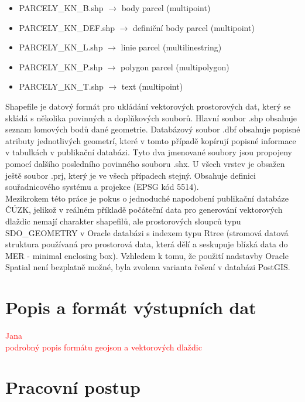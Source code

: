 \documentclass[12pt]{article}
\begin{document}
\begin{itemize}
\item PARCELY\_KN\_B.shp $\rightarrow$ body parcel (multipoint)
\item PARCELY\_KN\_DEF.shp $\rightarrow$ definiční body parcel (multipoint)
\item PARCELY\_KN\_L.shp $\rightarrow$ linie parcel (multilinestring)
\item PARCELY\_KN\_P.shp $\rightarrow$ polygon parcel (multipolygon)
\item PARCELY\_KN\_T.shp $\rightarrow$ text (multipoint)
\end{itemize}

Shapefile je datový formát pro ukládání vektorových prostorových dat, který se skládá s několika povinných a doplňkových souborů. Hlavní soubor .shp obsahuje seznam lomových bodů dané geometrie. Databázový soubor .dbf obsahuje popisné atributy jednotlivých geometrí, které v tomto případě kopírují popisné informace v tabulkách v publikační databázi. Tyto dva jmenované soubory jsou propojeny pomocí dalšího posledního povinného souboru .shx. U všech vrstev je obsažen ještě soubor .prj, který je ve všech případech stejný. Obsahuje definici souřadnicového systému a projekce (EPSG kód 5514). \\
\indent Mezikrokem této práce je pokus o jednoduché napodobení publikační databáze ČÚZK, jelikož v reálném příkladě počáteční data pro generování vektorových dlaždic nemají charakter shapefilů, ale prostorových sloupců typu SDO\_GEOMETRY v Oracle databázi s indexem typu Rtree  (stromová datová struktura používaná pro prostorová data, která dělí a seskupuje blízká data do MER - minimal enclosing box). Vzhledem k tomu, že použití nadstavby Oracle Spatial není bezplatně možné, byla zvolena varianta řešení v databázi PostGIS.



\clearpage 
\section{Popis a formát výstupních dat}

\textcolor{red}{
Jana\\
podrobný popis formátu geojson a vektorových dlaždic}

\clearpage 
\section{Pracovní postup}
\end{document}
